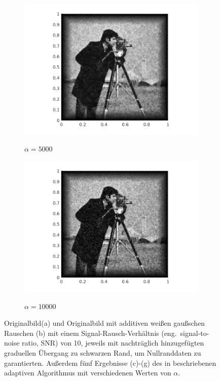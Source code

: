 \begin{figure}[!ht]
  \begin{subfigure}{.3\linewidth}
    \caption{$\alpha=5000$}
    \includegraphics[trim = 60 0 60 20, clip, width=\linewidth]
      {pictures/introBeta/snr10/05000.png}
    \label{fig:snr10alpha5000}
  \end{subfigure}
  \begin{subfigure}{.3\linewidth}
    \caption{$\alpha=10000$}
    \includegraphics[trim = 60 0 60 20, clip, width=\linewidth]
      {pictures/introBeta/snr10/10000.png}
    \label{fig:snr10alpha10000}
  \end{subfigure}
  \caption{Originalbild\protect\footnotemark (a) und
    Originalbild mit additiven weißen gaußschen Rauschen (b) mit einem
    Signal-Rausch-Verhältnis (eng.\ signal-to-noise ratio, SNR) von 10, jeweils
    mit nachträglich hinzugefügten graduellen Übergang zu schwarzen Rand, um 
    Nullranddaten zu garantierten. 
    Außerdem fünf Ergebnisse (c)-(g) des in 
    beschriebenen adaptiven Algorithmus mit verschiedenen Werten von $\alpha$.}
  \label{fig:exampleDenoising}
\end{figure}

